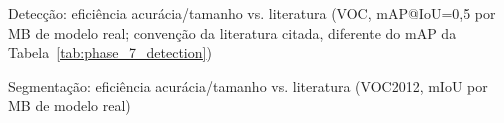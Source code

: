 \documentclass[conference]{IEEEtran}
\begin{document}
\begin{table}[!t]
\begin{minipage}[t][1.5cm][t]{0.49\textwidth}
\centering
\caption{Detecção: eficiência acurácia/tamanho vs. literatura (VOC, mAP@IoU=0,5 por MB de modelo
real; convenção da literatura citada, diferente do mAP da Tabela~\ref{tab:phase_7_detection})}
\label{tab:lit_comparison_detection}
\end{minipage}\hfill
\begin{minipage}[t][1.5cm][t]{0.49\textwidth}
\centering
\caption{Segmentação: eficiência acurácia/tamanho vs. literatura (VOC2012, mIoU por MB de modelo
real)}
\label{tab:lit_comparison_segmentation}
\end{minipage}


\end{table}
\end{document}
